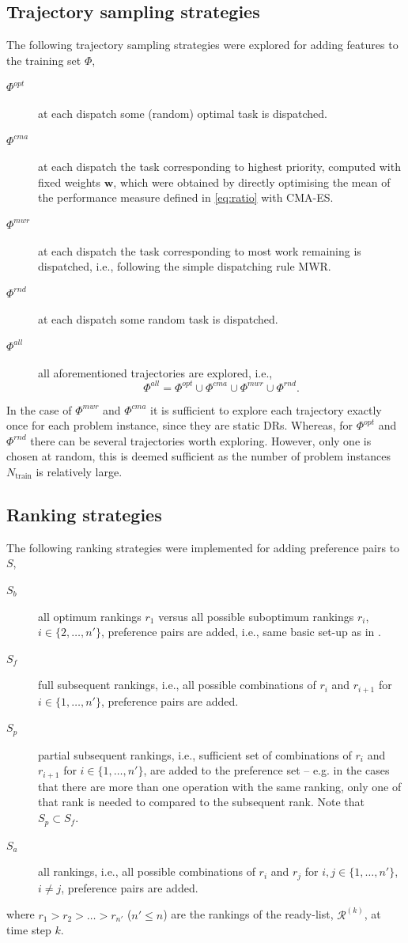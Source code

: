 \documentclass[smallextended]{llncs}
\renewcommand{\vec}[1]{\mathbf{#1}}
\begin{document}
\subsection{Trajectory sampling strategies}\label{sec:tracks}
The following trajectory sampling strategies were explored for adding features to the training set $\Phi$,
\begin{description}
\item[$\Phi^{opt}$] at each dispatch some (random) optimal task is dispatched.
\item[$\Phi^{cma}$] at each dispatch the task corresponding to highest priority, computed with fixed weights $\vec{w}$, which were obtained by directly optimising the mean of the performance measure defined in \cref{eq:ratio} with CMA-ES. 
\item[$\Phi^{mwr}$] at each dispatch the task corresponding to most work remaining is dispatched, i.e., following the simple dispatching rule MWR.
\item[$\Phi^{rnd}$] at each dispatch some random task is dispatched.
\item[$\Phi^{all}$] all aforementioned trajectories are explored, i.e., $$\Phi^{all}=\Phi^{opt}\cup \Phi^{cma}\cup \Phi^{mwr} \cup \Phi^{rnd}.$$
\end{description}
In the case of $\Phi^{mwr}$ and $\Phi^{cma}$ it is sufficient to explore each trajectory exactly once for each problem instance, since they are static DRs. Whereas, for $\Phi^{opt}$ and $\Phi^{rnd}$ there can be several trajectories worth exploring. However, only one is chosen at random, this is deemed sufficient as the number of problem instances $N_{\text{train}}$ is relatively large.

\subsection{Ranking strategies}\label{sec:ranks}
The following ranking strategies were implemented for adding preference pairs to $S$,
\begin{description}
\item[$S_b$] all optimum rankings $r_1$ versus all possible suboptimum rankings $r_i$, $i\in\{2,\ldots,n'\}$, preference pairs are added, i.e., same basic set-up as in \cite{InRu11a}. %
\item[$S_f$] full subsequent rankings, i.e., all possible combinations of $r_i$ and $r_{i+1}$ for $i\in\{1,\ldots,n'\}$, preference pairs are added.
\item[$S_p$] partial subsequent rankings, i.e., sufficient set of combinations of $r_i$ and $r_{i+1}$ for $i\in\{1,\ldots,n'\}$, are added to the preference set -- e.g. in the cases that there are more than one operation with the same ranking, only one of that rank is needed to compared to the subsequent rank. Note that $S_p\subset S_f$.
\item[$S_a$] all rankings, i.e., all possible combinations of $r_i$ and $r_j$ for $i,j\in\{1,\ldots,n'\}$, \mbox{$i\neq j$}, preference pairs are added.
\end{description}
where $r_1>r_2>\ldots>r_{n'}$ ($n'\leq n$) are the rankings of the ready-list, $\mathcal{R}^{(k)}$, at time step $k$.
\end{document}
